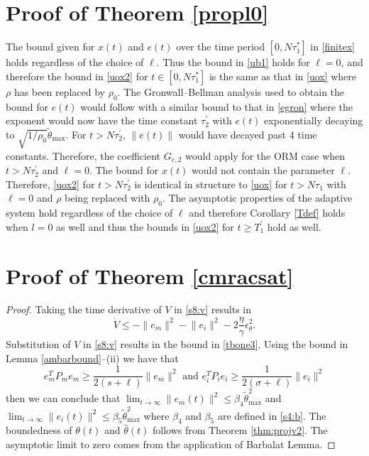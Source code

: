 \documentclass[10pt,journal]{IEEEtran}
\theoremstyle{plain}%
\theoremstyle{definition}
\newcommand{\be}[0]{\begin{equation}}
\newcommand{\ee}[0]{\end{equation}}
\newcommand{\ben}[0]{\begin{equation*}}
\newcommand{\een}[0]{\end{equation*}}
\newcommand{\norms}[1]{\lVert#1\rVert}
\newcommand{\normB}[0]{\norms}
\let\norm=\normB
\begin{document}
\section{Proof of Theorem \ref{propl0}}\label{pfl0}
The bound given for $x(t)$ and $e(t)$ over the time period $[0,N\tau_1^*]$ in \eqref{finitex} holds regardless of the choice of $\ell$. Thus the bound in \eqref{ub1} holds for $\ell=0$, and therefore the bound in \eqref{uox2} for $t\in[0,N\tau_1^*]$ is the same as that in \eqref{uox} where $\rho$  has been replaced by $\rho_0$. The Gronwall--Bellman analysis used to obtain the bound for $e(t)$ would follow with a similar bound to that in \eqref{egron} where the exponent would now have the time constant $\tau_2^\prime$ with $e(t)$ exponentially decaying to $\sqrt{1/\rho_0}\tilde\theta_\text{max}$. For $t>N\tau_2^\prime$, $\norm{e(t)}$ would have decayed past 4 time constants. Therefore, the coefficient $G_{e,2}$ would apply for the ORM case when $t>N\tau_2^\prime$ and $\ell=0$. The bound for $x(t)$ would not contain the parameter $\ell$. Therefore, \eqref{uox2} for $t> N\tau_2^\prime$ is identical in structure to \eqref{uox} for $t>N\tau_1$ with $\ell=0$ and $\rho$ being replaced with $\rho_0$. The asymptotic properties of the adaptive system hold regardless of the choice of $\ell$ and therefore Corollary \ref{Tdef} holds when $l=0$ as well and thus the bounds in \eqref{uox2} for $t\geq T_1^\prime$ hold as well.


\section{Proof of Theorem \ref{cmracsat}} \label{proofcmracsat}
\begin{proof}
Taking the time derivative of $V$ in \eqref{s8:v} results in
\be
\dot V \leq -\norm{e_m}^2 -\norm{e_i}^2 -2 \frac\eta\gamma\epsilon_\theta^2.
\ee
Substitution of $V$ in \eqref{s8:v} results in
the bound in \eqref{tbone3}. Using the bound in Lemma \ref{ambarbound}--(ii) we have that 
\ben e_m^TP_me_m \geq \frac 1 {2(s+\ell) }\norm {e_m}^2 \text{ and } e_i^TP_ie_i \geq \frac 1 {2 (\sigma+\ell)  }\norm {e_i}^2 \een 
then we can conclude that
${\lim_{t\rightarrow\infty}\norm {e_m(t)}^2 \leq \beta_4 \tilde\theta_\text{max}^2}$ and ${\lim_{t\rightarrow\infty}\norm {e_i(t)}^2 \leq \beta_5 \tilde\theta_\text{max}^2}$
where $\beta_4$ and $\beta_5$ are defined in \eqref{s4:b}. The boundedness of $\theta(t)$ and $\hat\theta(t)$ follows from Theorem \ref{thm:projv2}. The asymptotic limit to zero comes from the application of Barbalat Lemma.
\end{proof}
\end{document}
